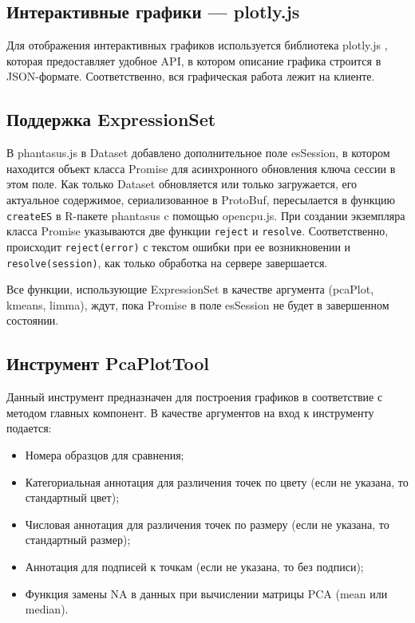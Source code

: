 \documentclass[specification,annotation]{itmo-student-thesis}
\begin{document}
\subsection{Интерактивные графики --- plotly.js}
Для отображения интерактивных графиков используется библиотека plotly.js \cite{plotly}, которая предоставляет удобное API, в котором описание графика строится в JSON-формате. Соответственно, вся графическая работа лежит на клиенте.

\subsection{Поддержка ExpressionSet}
В phantasus.js в Dataset добавлено дополнительное поле esSession, в котором находится объект класса Promise для асинхронного обновления ключа сессии в этом поле.
Как только Dataset обновляется или только загружается, его актуальное содержимое, сериализованное в ProtoBuf, пересылается в функцию \texttt{createES} в R-пакете phantasus c помощью opencpu.js.
При создании экземпляра класса Promise указываются две функции \texttt{reject} и \texttt{resolve}. Соответственно, происходит \texttt{reject(error)} с текстом ошибки при ее возникновении и \texttt{resolve(session)}, как только обработка на сервере завершается.

Все функции, использующие ExpressionSet в качестве аргумента (pcaPlot, kmeans, limma), ждут, пока Promise в поле esSession не будет в завершенном состоянии.

\subsection{Инструмент PcaPlotTool}
Данный инструмент предназначен для построения графиков в соответствие с методом главных компонент.
В качестве аргументов на вход к инструменту подается:
\begin{itemize}
\item Номера образцов для сравнения;
\item Категориальная аннотация для различения точек по цвету (если не указана, то стандартный цвет);
\item Числовая аннотация для различения точек по размеру (если не указана, то стандартный размер);
\item Аннотация для подписей к точкам (если не указана, то без подписи);
\item Функция замены NA в данных при вычислении матрицы PCA (mean или median).
\end{itemize}
\end{document}
